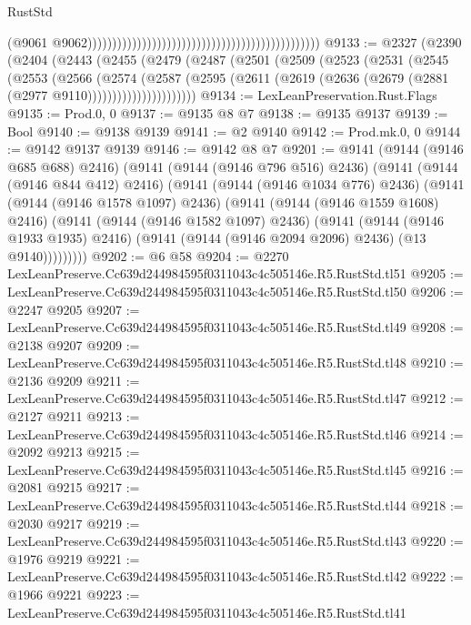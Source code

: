 \begin{lexlean}{RustStd}
\begin{coremodule}
                                                                                                (@9061
                                                                                                  @9062)))))))))))))))))))))))))))))))))))))))))))))))
@9133 := @2327
    (@2390
      (@2404
        (@2443
          (@2455
            (@2479
              (@2487
                (@2501
                  (@2509
                    (@2523
                      (@2531
                        (@2545
                          (@2553
                            (@2566
                              (@2574
                                (@2587
                                  (@2595
                                    (@2611
                                      (@2619 (@2636 (@2679 (@2881 (@2977 @9110))))))))))))))))))))))
@9134 := LexLeanPreservation.Rust.Flags
@9135 := Prod.{0, 0}
@9137 := @9135 @8 @7
@9138 := @9135 @9137
@9139 := Bool
@9140 := @9138 @9139
@9141 := @2 @9140
@9142 := Prod.mk.{0, 0}
@9144 := @9142 @9137 @9139
@9146 := @9142 @8 @7
@9201 := @9141
    (@9144 (@9146 @685 @688) @2416)
    (@9141
      (@9144 (@9146 @796 @516) @2436)
      (@9141
        (@9144 (@9146 @844 @412) @2416)
        (@9141
          (@9144 (@9146 @1034 @776) @2436)
          (@9141
            (@9144 (@9146 @1578 @1097) @2436)
            (@9141
              (@9144 (@9146 @1559 @1608) @2416)
              (@9141
                (@9144 (@9146 @1582 @1097) @2436)
                (@9141
                  (@9144 (@9146 @1933 @1935) @2416)
                  (@9141 (@9144 (@9146 @2094 @2096) @2436) (@13 @9140)))))))))
@9202 := @6 @58
@9204 := @2270 LexLeanPreserve.Cc639d244984595f0311043c4c505146e.R5.RustStd.tl51
@9205 := LexLeanPreserve.Cc639d244984595f0311043c4c505146e.R5.RustStd.tl50
@9206 := @2247 @9205
@9207 := LexLeanPreserve.Cc639d244984595f0311043c4c505146e.R5.RustStd.tl49
@9208 := @2138 @9207
@9209 := LexLeanPreserve.Cc639d244984595f0311043c4c505146e.R5.RustStd.tl48
@9210 := @2136 @9209
@9211 := LexLeanPreserve.Cc639d244984595f0311043c4c505146e.R5.RustStd.tl47
@9212 := @2127 @9211
@9213 := LexLeanPreserve.Cc639d244984595f0311043c4c505146e.R5.RustStd.tl46
@9214 := @2092 @9213
@9215 := LexLeanPreserve.Cc639d244984595f0311043c4c505146e.R5.RustStd.tl45
@9216 := @2081 @9215
@9217 := LexLeanPreserve.Cc639d244984595f0311043c4c505146e.R5.RustStd.tl44
@9218 := @2030 @9217
@9219 := LexLeanPreserve.Cc639d244984595f0311043c4c505146e.R5.RustStd.tl43
@9220 := @1976 @9219
@9221 := LexLeanPreserve.Cc639d244984595f0311043c4c505146e.R5.RustStd.tl42
@9222 := @1966 @9221
@9223 := LexLeanPreserve.Cc639d244984595f0311043c4c505146e.R5.RustStd.tl41

\end{coremodule}
\end{lexlean}
